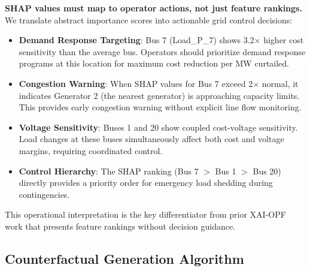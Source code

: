 \documentclass[journal,12pt,onecolumn]{IEEEtran}
\begin{document}
\textbf{SHAP values must map to operator actions, not just feature rankings.} We translate abstract importance scores into actionable grid control decisions:

\begin{itemize}
    \item \textbf{Demand Response Targeting}: Bus 7 (Load\_P\_7) shows 3.2$\times$ higher cost sensitivity than the average bus. Operators should prioritize demand response programs at this location for maximum cost reduction per MW curtailed.
    
    \item \textbf{Congestion Warning}: When SHAP values for Bus 7 exceed 2$\times$ normal, it indicates Generator 2 (the nearest generator) is approaching capacity limits. This provides early congestion warning without explicit line flow monitoring.
    
    \item \textbf{Voltage Sensitivity}: Buses 1 and 20 show coupled cost-voltage sensitivity. Load changes at these buses simultaneously affect both cost and voltage margins, requiring coordinated control.
    
    \item \textbf{Control Hierarchy}: The SHAP ranking (Bus 7 $>$ Bus 1 $>$ Bus 20) directly provides a priority order for emergency load shedding during contingencies.
\end{itemize}

This operational interpretation is the key differentiator from prior XAI-OPF work that presents feature rankings without decision guidance.

\vspace{0.5em}
\noindent{}
\vspace{0.5em}

\subsection{Counterfactual Generation Algorithm}
\end{document}
